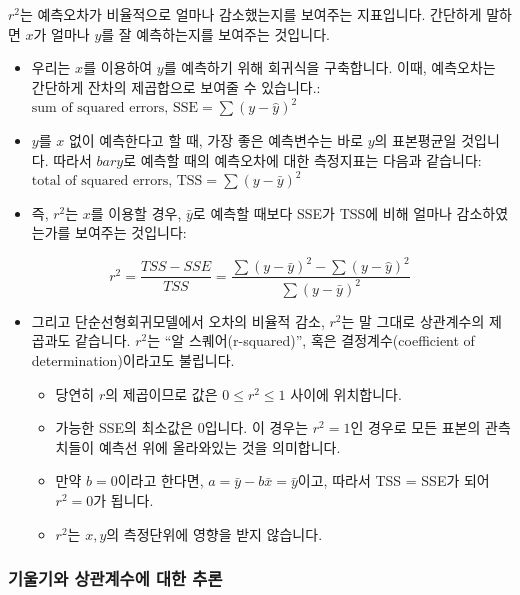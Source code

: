 \documentclass[]{book}
\providecommand{\tightlist}{%
  \setlength{\itemsep}{0pt}\setlength{\parskip}{0pt}}
\begin{document}
\(r^2\)는 예측오차가 비율적으로 얼마나 감소했는지를 보여주는 지표입니다. 간단하게 말하면 \(x\)가 얼마나 \(y\)를 잘 예측하는지를 보여주는 것입니다.

\begin{itemize}
\item
  우리는 \(x\)를 이용하여 \(y\)를 예측하기 위해 회귀식을 구축합니다. 이때, 예측오차는 간단하게 잔차의 제곱합으로 보여줄 수 있습니다.: \(\text{sum of squared errors, SSE} = \sum(y - \hat{y})^2\)
\item
  \(y\)를 \(x\) 없이 예측한다고 할 때, 가장 좋은 예측변수는 바로 \(y\)의 표본평균일 것입니다. 따라서 \(bar{y}\)로 예측할 때의 예측오차에 대한 측정지표는 다음과 같습니다: \(\text{total of squared errors, TSS} = \sum(y - \bar{y})^2\)
\item
  즉, \(r^2\)는 \(x\)를 이용할 경우, \(\bar{y}\)로 예측할 때보다 SSE가 TSS에 비해 얼마나 감소하였는가를 보여주는 것입니다:
\end{itemize}

\[r^2 = \frac{TSS-SSE}{TSS} = \frac{\sum (y-\bar{y})^2 - \sum(y - \hat{y})^2}{\sum(y-\bar{y})^2}\]

\begin{itemize}
\item
  그리고 단순선형회귀모델에서 오차의 비율적 감소, \(r^2\)는 말 그대로 상관계수의 제곱과도 같습니다. \(r^2\)는 ``알 스퀘어(r-squared)'', 혹은 결정계수(coefficient of determination)이라고도 불립니다.

  \begin{itemize}
  \tightlist
  \item
    당연히 \(r\)의 제곱이므로 값은 \(0 \leq r^2 \leq 1\) 사이에 위치합니다.
  \item
    가능한 SSE의 최소값은 0입니다. 이 경우는 \(r^2 = 1\)인 경우로 모든 표본의 관측치들이 예측선 위에 올라와있는 것을 의미합니다.
  \item
    만약 \(b=0\)이라고 한다면, \(a = \bar{y} - b\bar{x} = \bar{y}\)이고, 따라서 TSS = SSE가 되어 \(r^2 = 0\)가 됩니다.
  \item
    \(r^2\)는 \(x, y\)의 측정단위에 영향을 받지 않습니다.
  \end{itemize}
\end{itemize}

\hypertarget{uxae30uxc6b8uxae30uxc640-uxc0c1uxad00uxacc4uxc218uxc5d0-uxb300uxd55c-uxcd94uxb860}{%
\subsubsection{기울기와 상관계수에 대한 추론}\label{uxae30uxc6b8uxae30uxc640-uxc0c1uxad00uxacc4uxc218uxc5d0-uxb300uxd55c-uxcd94uxb860}}
\end{document}
